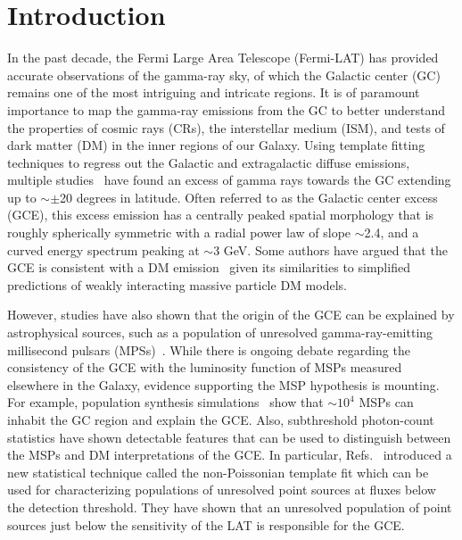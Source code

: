 \documentclass[%
reprint,
superscriptaddress,
amsmath,amssymb,
aps,
floatfix,
]{revtex4-1}
\begin{document}
\section{Introduction}
In the past decade, the Fermi Large Area Telescope (Fermi-LAT) has provided accurate observations of the gamma-ray sky, of which the Galactic center (GC) remains one of the most intriguing and intricate regions. It is of paramount importance to map the gamma-ray emissions from the GC to better understand the properties of cosmic rays (CRs), the interstellar medium (ISM), and tests of dark matter (DM) in the inner regions of our Galaxy. Using template fitting techniques to regress out the Galactic and extragalactic diffuse emissions, multiple studies~\cite{Goodenough:2009gk,Vitale:2009hr,Hooper:2010mq,Abazajian:2012pn,Gordon:2013vta, Macias:2013vya,Hooper:2013rwa,Abazajian:2014fta,Daylan:2014rsa,Calore:2014xka,Zhou:2014lva,TheFermi-LAT:2015kwa,TheFermi-LAT:2017vmf} have found an excess of gamma rays towards the GC extending up to $\sim\pm$20 degrees in latitude. Often referred to as the Galactic center excess (GCE), this excess emission has a centrally peaked spatial morphology that is roughly spherically symmetric with a radial power law of slope $\sim$2.4, and a curved energy spectrum peaking at $\sim$3 GeV. Some authors have argued that the GCE is consistent with a DM emission~\cite{Goodenough:2009gk,Abazajian:2012pn,Gordon:2013vta,Macias:2013vya,Calore:2014xka,Daylan:2014rsa} given its similarities to simplified predictions of weakly interacting massive particle DM models.

However, studies have also shown that the origin of the GCE can be explained by astrophysical sources, such as a population of unresolved gamma-ray-emitting millisecond pulsars (MPSs)~\cite{Abazajian:2010zy,Abazajian:2012pn,Gordon:2013vta,Macias:2013vya,Calore:2014xka,Daylan:2014rsa}. While there is ongoing debate regarding the consistency of the GCE with the luminosity function of MSPs measured elsewhere in the Galaxy\cite{Cholis:2014lta, Hooper:2015jlu, Ploeg:2017vai, Bartels:2018xom}, evidence supporting the MSP hypothesis is mounting. For example, population synthesis simulations~\cite{Gonthier:2018ymi} show that $\sim$$10^4$ MSPs can inhabit the GC region and explain the GCE. Also, subthreshold photon-count statistics have shown detectable features that can be used to distinguish between the MSPs and DM interpretations of the GCE. In particular, Refs.~\cite{Lee:2015fea,Mishra-Sharma:2016gis} introduced a new statistical technique called the non-Poissonian template fit which can be used for characterizing populations of unresolved point sources at fluxes below the detection threshold. They have shown that an unresolved population of point sources just below the sensitivity of the LAT is responsible for the GCE.
\end{document}
